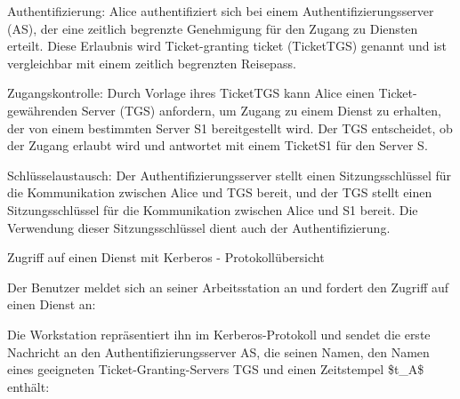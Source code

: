 \documentclass[a4paper]{article}
\begin{document}
\begin{multicols}{3}
\begin{itemize*}
            \begin{itemize*}
                  \item Authentifizierung: Alice authentifiziert sich bei einem Authentifizierungsserver (AS), der eine zeitlich begrenzte Genehmigung für den Zugang zu Diensten erteilt. Diese Erlaubnis wird Ticket-granting ticket (TicketTGS) genannt und ist vergleichbar mit einem zeitlich begrenzten Reisepass.
                  \item Zugangskontrolle: Durch Vorlage ihres TicketTGS kann Alice einen Ticket-gewährenden Server (TGS) anfordern, um Zugang zu einem Dienst zu erhalten, der von einem bestimmten Server S1 bereitgestellt wird. Der TGS entscheidet, ob der Zugang erlaubt wird und antwortet mit einem TicketS1 für den Server S.
                  \item Schlüsselaustausch: Der Authentifizierungsserver stellt einen Sitzungsschlüssel für die Kommunikation zwischen Alice und TGS bereit, und der TGS stellt einen Sitzungsschlüssel für die Kommunikation zwischen Alice und S1 bereit. Die Verwendung dieser Sitzungsschlüssel dient auch der Authentifizierung.
            \end{itemize*}
      \end{itemize*}

      Zugriff auf einen Dienst mit Kerberos - Protokollübersicht

      \begin{itemize*}
            \item
            Der Benutzer meldet sich an seiner Arbeitsstation an und fordert den
            Zugriff auf einen Dienst an:

            \begin{itemize*}
                  \item Die Workstation repräsentiert ihn im Kerberos-Protokoll und sendet die erste Nachricht an den Authentifizierungsserver AS, die seinen Namen, den Namen eines geeigneten Ticket-Granting-Servers TGS und einen Zeitstempel \$t\_A\$ enthält:
            \end{itemize*}


\end{itemize*}
\end{multicols}
\end{document}
